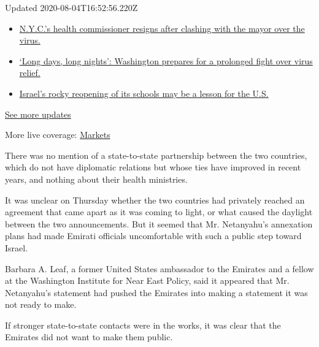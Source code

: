 Updated 2020-08-04T16:52:56.220Z

\begin{itemize}
\tightlist
\item
  \href{https://www.nytimes.com/2020/08/04/world/coronavirus-covid-19.html?action=click\&pgtype=Article\&state=default\&region=MAIN_CONTENT_1\&context=storylines_live_updates\#link-4d1eafa8}{N.Y.C.'s
  health commissioner resigns after clashing with the mayor over the
  virus.}
\item
  \href{https://www.nytimes.com/2020/08/04/world/coronavirus-covid-19.html?action=click\&pgtype=Article\&state=default\&region=MAIN_CONTENT_1\&context=storylines_live_updates\#link-6b644638}{`Long
  days, long nights': Washington prepares for a prolonged fight over
  virus relief.}
\item
  \href{https://www.nytimes.com/2020/08/04/world/coronavirus-covid-19.html?action=click\&pgtype=Article\&state=default\&region=MAIN_CONTENT_1\&context=storylines_live_updates\#link-7af9fca0}{Israel's
  rocky reopening of its schools may be a lesson for the U.S.}
\end{itemize}

\href{https://www.nytimes.com/2020/08/04/world/coronavirus-covid-19.html?action=click\&pgtype=Article\&state=default\&region=MAIN_CONTENT_1\&context=storylines_live_updates}{See
more updates}

More live coverage:
\href{https://www.nytimes.com/live/2020/08/04/business/stock-market-today-coronavirus?action=click\&pgtype=Article\&state=default\&region=MAIN_CONTENT_1\&context=storylines_live_updates}{Markets}

There was no mention of a state-to-state partnership between the two
countries, which do not have diplomatic relations but whose ties have
improved in recent years, and nothing about their health ministries.

It was unclear on Thursday whether the two countries had privately
reached an agreement that came apart as it was coming to light, or what
caused the daylight between the two announcements. But it seemed that
Mr. Netanyahu's annexation plans had made Emirati officials
uncomfortable with such a public step toward Israel.

Barbara A. Leaf, a former United States ambassador to the Emirates and a
fellow at the Washington Institute for Near East Policy, said it
appeared that Mr. Netanyahu's statement had pushed the Emirates into
making a statement it was not ready to make.

If stronger state-to-state contacts were in the works, it was clear that
the Emirates did not want to make them public.

